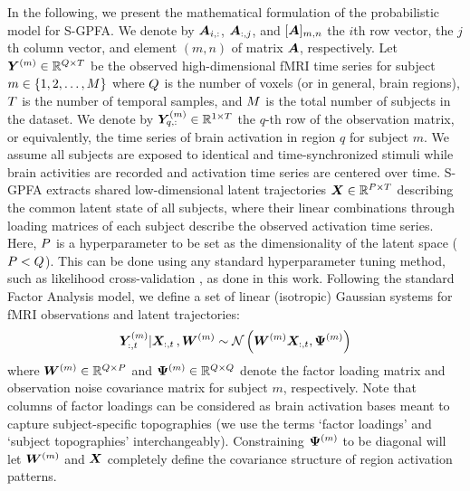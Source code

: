 \label{ch1:subsec:model}
In the following, we present the mathematical formulation of the probabilistic model for S-GPFA. We denote by $\bm{A}_{i,:}$, $\bm{A}_{:, j}$, and $[\bm{A}]_{m,n}$ the $i$th row vector, the $j$th column vector, and element $(m, n)$ of matrix $\bm{A}$, respectively. Let $\bm{Y}^{(m)} \in \mathbb{R}^{Q \times T}$ be the observed high-dimensional fMRI time series for subject $m \in \{1, 2, \ldots, M \}$ where $Q$ is the number of voxels (or in general, brain regions), $T$ is the number of temporal samples, and $M$ is the total number of subjects in the dataset. We denote by $\bm{Y}^{(m)}_{q,:} \in \mathbb{R}^{1\times T}$ the $q$-th row of the observation matrix, or equivalently, the time series of brain activation in region $q$ for subject $m$. We assume all subjects are exposed to identical and time-synchronized stimuli while brain activities are recorded and activation time series are centered over time.
S-GPFA extracts shared low-dimensional latent trajectories $\bm{X} \in \mathbb{R}^{P \times T}$ describing the common latent state of all subjects, where their linear combinations through loading matrices of each subject describe the observed activation time series.
Here, $P$ is a hyperparameter to be set as the dimensionality of the latent space ($P < Q$). This can be done using any standard hyperparameter tuning method, such as likelihood cross-validation \cite{smyth1997cross}, as done in this work.  
Following the standard Factor Analysis model, we define a set of linear (isotropic) Gaussian systems for fMRI observations and latent trajectories:
\begin{equation}
    \bm{Y}^{(m)}_{:, t} | \bm{X}_{:, t}\, , \bm{W}^{(m)} \sim \mathcal{N} \left( \bm{W}^{(m)} \bm{X}_{:, t}, \bm{\Psi}^{(m)} \right)
\end{equation}
where $\bm{W}^{(m)} \in \mathbb{R}^{Q \times P}$ and $\bm{\Psi}^{(m)} \in \mathbb{R}^{Q \times Q}$ denote the factor loading matrix and observation noise covariance matrix for subject $m$, respectively. Note that columns of factor loadings can be considered as brain activation bases meant to capture subject-specific topographies (we use the terms `factor loadings' and `subject topographies' interchangeably). Constraining $\bm{\Psi}^{(m)}$ to be diagonal will let $\bm{W}^{(m)}$ and $\bm{X}$ completely define the covariance structure of region activation patterns.
